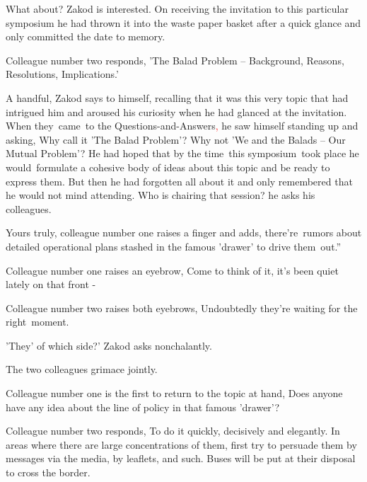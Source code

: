 \documentclass[letterpaper]{article}
\begin{document}
{\textquotedbl}What about?{\textquotedbl} Zakod is interested. On receiving the invitation to this particular symposium
he had thrown it into the waste paper basket after a quick glance and only committed the date to memory. 

Colleague number two responds, {\textquotedbl}'The Balad Problem -- Background, Reasons, Resolutions,
Implications.{}'{\textquotedbl} 

A handful, Zakod says to himself, recalling that it was this very topic that had intrigued him and aroused his curiosity
when he had glanced at the invitation. When they\textcolor{red}{\ }came\textcolor[rgb]{0.0,0.4392157,0.7529412}{\ }to
the Questions-and-Answers\textcolor{red}{, }he saw himself standing up and asking, {\textquotedbl}Why call it 'The
Balad Problem'? Why not 'We and the Balads -- Our Mutual Problem'?{\textquotedbl} He had hoped that by the time~this
symposium\textcolor{red}{\ }took place he would~formulate a cohesive body of ideas about this topic and be ready to
express them. But then he had forgotten all about it and only remembered that he would not mind attending.
{\textquotedbl}Who is chairing that session?{\textquotedbl} he asks his colleagues. 

{\textquotedbl}Yours truly,{\textquotedbl} colleague number one raises a finger and adds, {\textquotedbl}there're~rumors
about detailed operational plans stashed in the famous 'drawer{}' to drive them\ out.''

Colleague number one raises an eyebrow, {\textquotedbl}Come to think of it, it's been quiet lately on that front
-{\textquotedbl} 

Colleague number two raises both eyebrows, {\textquotedbl}Undoubtedly they're waiting for the
right~moment.{\textquotedbl} 

{\textquotedbl}'They' of which side?{\textquotedbl}{}' Zakod asks nonchalantly.

The two colleagues grimace jointly. 

Colleague number one is the first to return to the topic at hand, {\textquotedbl}Does anyone have any idea about the
line of policy in that famous {}'drawer{}'?{\textquotedbl} 

Colleague number two responds, {\textquotedbl}To do it quickly, decisively and elegantly. In areas where there are large
concentrations of them, first try to persuade them by messages via the media, by leaflets, and such. Buses will be put
at their disposal to cross the border.{\textquotedbl} 
\end{document}
